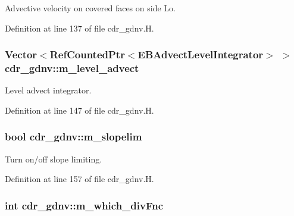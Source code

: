 Advective velocity on covered faces on side Lo. 



Definition at line 137 of file cdr\+\_\+gdnv.\+H.

\subsubsection[{\texorpdfstring{m\+\_\+level\+\_\+advect}{m_level_advect}}]{\setlength{\rightskip}{0pt plus 5cm}Vector$<$Ref\+Counted\+Ptr$<$E\+B\+Advect\+Level\+Integrator$>$ $>$ cdr\+\_\+gdnv\+::m\+\_\+level\+\_\+advect\hspace{0.3cm}{\ttfamily [protected]}}\hypertarget{classcdr__gdnv_a1f94232e428c9b4e234cdf3e5cfb0736}{}\label{classcdr__gdnv_a1f94232e428c9b4e234cdf3e5cfb0736}


Level advect integrator. 



Definition at line 147 of file cdr\+\_\+gdnv.\+H.

\subsubsection[{\texorpdfstring{m\+\_\+slopelim}{m_slopelim}}]{\setlength{\rightskip}{0pt plus 5cm}bool cdr\+\_\+gdnv\+::m\+\_\+slopelim\hspace{0.3cm}{\ttfamily [protected]}}\hypertarget{classcdr__gdnv_a9ec20ef995ece4e2b4c7bd8c84fb27f1}{}\label{classcdr__gdnv_a9ec20ef995ece4e2b4c7bd8c84fb27f1}


Turn on/off slope limiting. 



Definition at line 157 of file cdr\+\_\+gdnv.\+H.

\subsubsection[{\texorpdfstring{m\+\_\+which\+\_\+div\+Fnc}{m_which_divFnc}}]{\setlength{\rightskip}{0pt plus 5cm}int cdr\+\_\+gdnv\+::m\+\_\+which\+\_\+div\+Fnc\hspace{0.3cm}{\ttfamily [protected]}}\hypertarget{classcdr__gdnv_ac3d6217f969a9c3484c897b7e6432ea1}{}\label{classcdr__gdnv_ac3d6217f969a9c3484c897b7e6432ea1}


